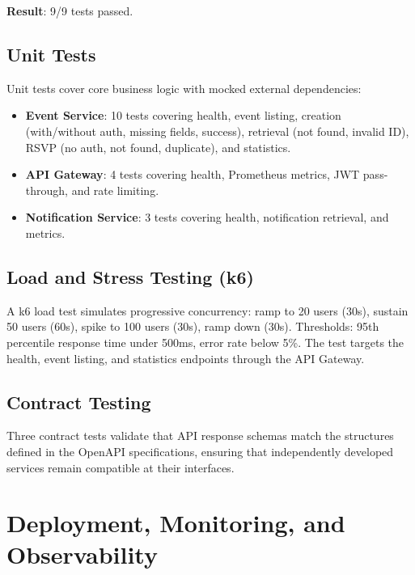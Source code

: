 \documentclass[12pt,a4paper]{article}
\begin{document}
\textbf{Result}: 9/9 tests passed.

\subsection{Unit Tests}

Unit tests cover core business logic with mocked external dependencies:

\begin{itemize}
    \item \textbf{Event Service}: 10 tests covering health, event listing, creation (with/without auth, missing fields, success), retrieval (not found, invalid ID), RSVP (no auth, not found, duplicate), and statistics.
    \item \textbf{API Gateway}: 4 tests covering health, Prometheus metrics, JWT pass-through, and rate limiting.
    \item \textbf{Notification Service}: 3 tests covering health, notification retrieval, and metrics.
\end{itemize}

\subsection{Load and Stress Testing (k6)}

A k6 load test simulates progressive concurrency: ramp to 20 users (30s), sustain 50 users (60s), spike to 100 users (30s), ramp down (30s). Thresholds: 95th percentile response time under 500ms, error rate below 5\%. The test targets the health, event listing, and statistics endpoints through the API Gateway.

\subsection{Contract Testing}

Three contract tests validate that API response schemas match the structures defined in the OpenAPI specifications, ensuring that independently developed services remain compatible at their interfaces.

\newpage

\section{Deployment, Monitoring, and Observability}
\end{document}
